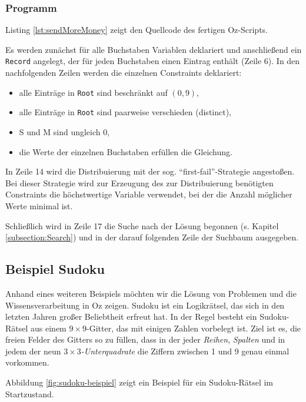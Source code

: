 \subsubsection{Programm}
Listing \ref{lst:sendMoreMoney} zeigt den Quellcode des fertigen Oz-Scripts.



Es werden zunächst für alle Buchstaben Variablen deklariert und anschließend ein
\texttt{Record} angelegt, der für jeden Buchstaben einen Eintrag enthält (Zeile
6). In den nachfolgenden Zeilen werden die einzelnen Constraints deklariert: 

\begin{itemize}
  \item alle Einträge in \texttt{Root} sind beschränkt auf $(0, 9)$,
  \item alle Einträge in \texttt{Root} sind paarweise verschieden (distinct),
  \item S und M sind ungleich 0,
  \item die Werte der einzelnen Buchstaben erfüllen die Gleichung.
\end{itemize}

In Zeile 14 wird die Distribuierung mit der sog. "`first-fail"'-Strategie 
angestoßen. Bei dieser Strategie wird zur Erzeugung des zur Distribuierung
benötigten Constraints die höchstwertige Variable verwendet, bei der die Anzahl
möglicher Werte minimal ist.

Schließlich wird in Zeile 17 die Suche nach der Lösung begonnen (s. Kapitel 
\ref{subsection:Search}) und in der darauf folgenden Zeile der Suchbaum 
ausgegeben.

\subsection{Beispiel Sudoku}
Anhand eines weiteren Beispiels möchten wir die Lösung von Problemen und die 
Wissensverarbeitung in Oz zeigen. Sudoku ist ein Logikrätsel, das sich in den 
letzten Jahren großer Beliebtheit erfreut hat. In der Regel besteht ein 
Sudoku-Rätsel aus einem $9 \times 9$-Gitter, das mit einigen Zahlen vorbelegt 
ist. Ziel ist es, die freien Felder des Gitters so zu füllen, dass in der jeder 
\textsl{Reihen}, \textsl{Spalten} und in jedem der neun \textsl{$3 \times 
3$-Unterquadrate} die Ziffern zwischen 1 und 9 genau einmal vorkommen.

Abbildung \ref{fig:sudoku-beispiel} zeigt ein Beispiel für ein Sudoku-Rätsel im
Startzustand.

